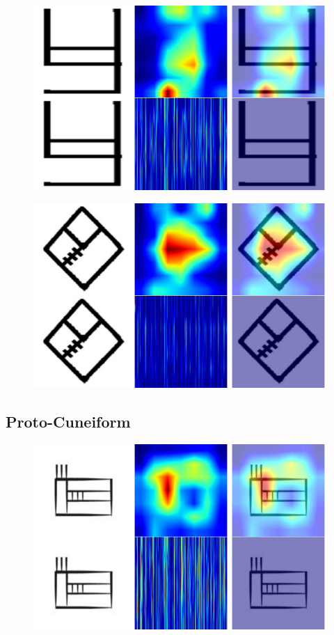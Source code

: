 \documentclass[11pt,a4paper,oneside]{report}
\begin{document}
 \begin{figure}[H]
    \centering
    \includegraphics[width=0.9\linewidth]{Visualizations/Grad-CAM/Indus/gradcam_363_combined.pdf}
\end{figure}

 \begin{figure}[H]
    \centering
    \includegraphics[width=0.9\linewidth]{Visualizations/Grad-CAM/Indus/gradcam_874_combined.pdf}
\end{figure}

\subsection{Proto-Cuneiform}
 \begin{figure}[H]
    \centering
    \includegraphics[width=0.9\linewidth]{Visualizations/Grad-CAM/Proto-Cuneiform/gradcam__3(N58).UR3~b1__combined.pdf}
\end{figure}
\end{document}
